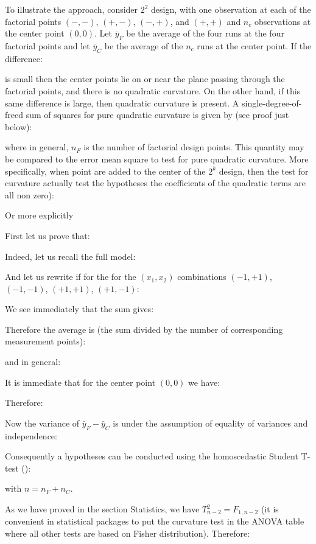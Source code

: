 	To illustrate the approach, consider $2^2$ design, with one observation at each of the factorial points $(-,-)$, $(+,-)$, $(-,+)$, and $(+,+)$ and $n_c$ observations at the center point $(0,0)$. Let $\bar{y}_F$ be the average of the four runs at the four factorial points and let $\bar{y}_C$ be the average of the $n_c$ runs at the center point. If the difference:
	
	is small then the center points lie on or near the plane passing through the factorial points, and there is no quadratic curvature. On the other hand, if this same difference is large, then quadratic curvature is present. A single-degree-of-freed sum of squares for pure quadratic curvature is given by (see proof just below):
	
	where in general, $n_F$ is the number of factorial design points. This quantity may be compared to the error mean square to test for pure quadratic curvature. More specifically, when point are added to the center of the $2^k$ design, then the test for curvature actually test the hypotheses the coefficients of the quadratic terms are all non zero):
	
	Or more explicitly
	
	First let us prove that:
	
	Indeed, let us recall the full model:
	
	And let us rewrite if for the for the $(x_1,x_2)$ combinations $(-1,+1)$, $(-1,-1)$, $(+1,+1)$, $(+1,-1)$:
	
	We see immediately that the sum gives:
	
	Therefore the average is (the sum divided by the number of corresponding measurement points):
	
	and in general:
	
	It is immediate that for the center point $(0,0)$ we have:
	
	Therefore:
	
	Now the variance of $\bar{y}_F-\bar{y}_C$ is under the assumption of equality of variances and independence:
	
	Consequently a hypotheses can be conducted using the homoscedastic Student T-test ():
	
	with $n=n_F+n_C$.
	
	As we have proved in the section Statistics, we have $T_{n-2}^2=F_{1,n-2}$ (it is convenient in statistical packages to put the curvature test in the ANOVA table where all other tests are based on Fisher distribution). Therefore:
	
